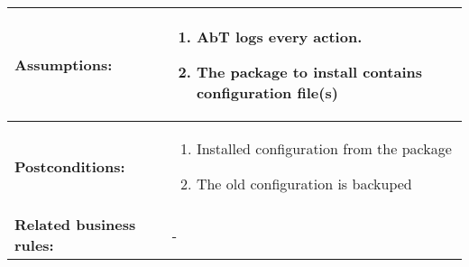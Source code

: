 \begin{tabularx}{\linewidth}{|l|X|}
\hline
\textbf{Assumptions:} & \begin{enumerate} 
							\item AbT logs every action.
							\item The package to install contains configuration file(s)
						\end{enumerate} \\
\hline
\textbf{Postconditions:} & 
  \begin{minipage}{\linewidth}
  \vspace{0.05em}
  \begin{enumerate}
    \item Installed configuration from the package
	\item The old configuration is backuped
  \end{enumerate}
  \vspace{0.05em}
\end{minipage}
\\
\hline
\textbf{Related business rules:} & - \\
\hline
\end{tabularx}


